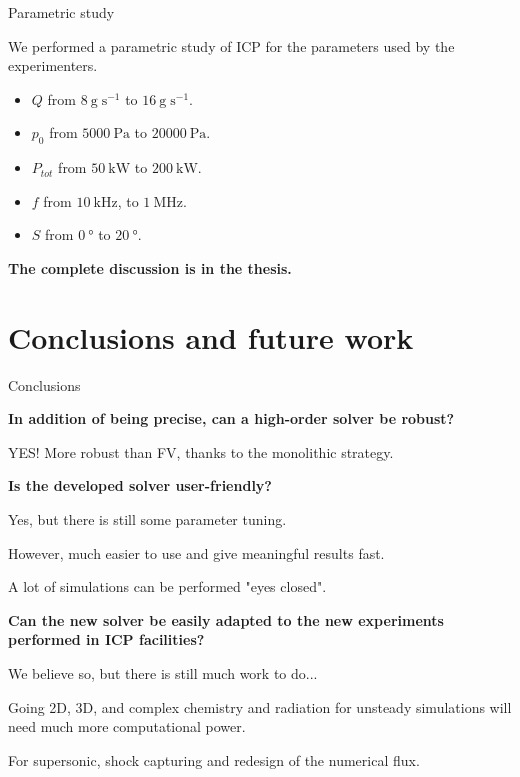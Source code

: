 \documentclass[24pt,t,table, aspectratio=169]{beamer}
\begin{document}
\begin{frame}{Parametric study}

We performed a parametric study of ICP for the parameters used by the experimenters.

\begin{itemize}
\item $Q$ from $\SI{8}{\gram\;\second^{-1}}$ to $\SI{16}{\gram\;\second^{-1}}$.
\item $p_0$ from $\SI{5000}{\pascal}$ to $\SI{20000}{\pascal}$.
\item $P_{tot}$ from $\SI{50}{\kilo\watt}$ to $\SI{200}{\kilo\watt}$.
\item $f$ from $\SI{10}{\kilo\hertz}$, to $\SI{1}{\mega\hertz}$.
\item $S$ from $\SI{0}{\degree}$ to $\SI{20}{\degree}$.
\end{itemize}

\begin{framed}
\centering
\textbf{The complete discussion is in the thesis.}
\end{framed}

\end{frame}

\section{Conclusions and future work}

\begin{frame}{Conclusions}

\begin{description}

{
\item[Q1] \textbf{In addition of being precise, can a high-order solver be robust?}
}

{
YES! More robust than FV, thanks to the monolithic strategy.
}

{
\item[Q2] \textbf{Is the developed solver user-friendly?} 
}
{

Yes, but there is still some parameter tuning.

However, much easier to use and give meaningful results fast.

A lot of simulations can be performed "eyes closed".
 
}

{
\item[Q3] \textbf{Can the new solver be easily adapted to the new experiments performed in ICP facilities?}
}

{
We believe so, but there is still much work to do...

Going 2D, 3D, and complex chemistry and radiation for unsteady simulations will need much more computational power.

For supersonic, shock capturing and redesign of the numerical flux.
}

\end{description}

\end{frame}
\end{document}
